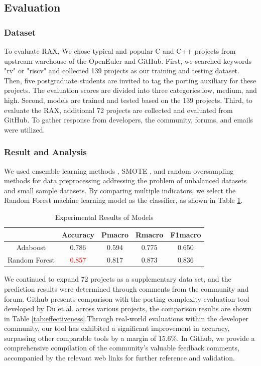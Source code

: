 \documentclass[sigconf,screen,review,anonymous]{acmart}
\begin{document}
{\subsection{Evaluation}
\subsubsection{Dataset}
 To evaluate RAX, We chose typical and popular C and C++ projects from upstream warehouse of the OpenEuler and GitHub\citep{stage2023}. First, we searched keywords "rv" or "riscv" and collected 139 projects as our training and testing dataset. Then, five postgraduate students are invited to tag the porting auxiliary for these projects. The evaluation scores are divided into three categories:low, medium, and high\citep{githubss}. Second, models are trained and tested based on the 139 projects. Third, to evaluate the RAX, additional 72 projects are collected and evaluated from GitHub. To gather response from developers, the community, forums, and emails were utilized. 
\subsubsection{Result and Analysis}
We used ensemble learning methods \cite{6509481}, SMOTE \cite{4271036}, and random oversampling methods for data preprocessing\cite{5128907} addressing the problem of unbalanced datasets and small sample datasets.
By comparing multiple indicators, we select the Random Forest machine learning model as the classifier, as shown in Table \ref{tab:evaluation}.

\begin{table}
  \caption{Experimental Results of Models}
  \label{tab:evaluation}
  \begin{tabular}{ccccc}
    \toprule
     & Accuracy & Pmacro & Rmacro & F1macro \\
    \midrule
    Adaboost & 0.786 & 0.594 & 0.775 & 0.650 \\
    Random Forest & \textcolor{red}{0.857} & 0.817 & 0.873 & 0.836 \\
  \bottomrule
\end{tabular}
\end{table}

We continued to expand 72 projects as a supplementary data set, and the prediction results were determined through comments from the community and forum.
Github presents comparison\cite{githubss} with the porting complexity evaluation tool developed by Du et al. across various projects, the comparison results are shown in Table \ref{tab:effectiveness}.Through real-world evaluations within the developer community, our tool has exhibited a significant improvement in accuracy, surpassing other comparable tools by a margin of 15.6\%. In Github, we provide a comprehensive compilation of the community's valuable feedback comments, accompanied by the relevant web links for further reference and validation.

}
\end{document}
